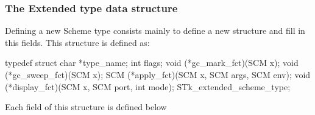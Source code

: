 \documentclass[10pt]{article}
\begin{document}
\subsubsection{The Extended type data structure}

Defining a new Scheme type consists mainly to define a new
 structure and fill in this fields. This
structure is defined as:
\begin{Code}
\begin{listing}[200]{2}
typedef struct {
  char *type_name;
  int  flags;                   
  void (*gc_mark_fct)(SCM x);
  void (*gc_sweep_fct)(SCM x);
  SCM  (*apply_fct)(SCM x, SCM args, SCM env);
  void (*display_fct)(SCM x, SCM port, int mode);
} STk_extended_scheme_type;
\end{listing}
\end{Code}
Each field of this structure is defined below
\end{document}
